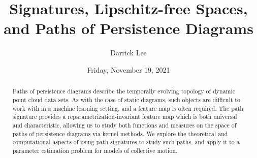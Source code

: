 \documentclass{UAmathtalk}
\author{Darrick Lee}
\title{Signatures, Lipschitz-free Spaces, and Paths of Persistence Diagrams}
\date{Friday, November 19, 2021}
\begin{document}
\maketitle


\begin{abstract}
Paths of persistence diagrams describe the temporally evolving topology of dynamic point cloud data sets. As with the case of static diagrams, such objects are difficult to work with in a machine learning setting, and a feature map is often required. The path signature provides a reparametrization-invariant feature map which is both universal and characteristic, allowing us to study both functions and measures on the space of paths of persistence diagrams via kernel methods. We explore the theoretical and computational aspects of using path signatures to study such paths, and apply it to a parameter estimation problem for models of collective motion.
\end{abstract}
\end{document}
